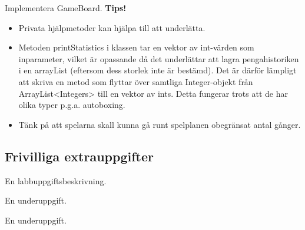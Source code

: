\Subtask Implementera GameBoard.
\newline
\newline
\textbf{Tips!} 

\begin{itemize}
\item Privata hjälpmetoder kan hjälpa till att underlätta.
\item Metoden printStatistics i klassen  tar en vektor av int-värden som inparameter, vilket är opassande då det underlättar att lagra pengahistoriken i en arrayList (eftersom dess storlek inte är bestämd). Det är därför lämpligt att skriva en metod som flyttar över samtliga Integer-objekt från ArrayList<Integers> till en vektor av ints. Detta fungerar trots att de har olika typer p.g.a. autoboxing. 
\item Tänk på att spelarna skall kunna gå runt spelplanen obegränsat antal gånger.

\end{itemize}




\subsection{Frivilliga extrauppgifter}

\Task En labbuppgiftsbeskrivning.

\Subtask En underuppgift.

\Subtask En underuppgift.
    
